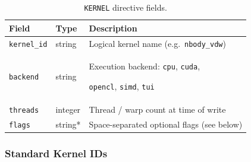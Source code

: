\documentclass[12pt, a4paper, oneside]{article}
\begin{document}
\begin{table}[htbp]

  \centering

  \caption{\texttt{KERNEL} directive fields.}

  \label{tab:kernel_fields}

  \begin{tabular}{lll}

    \toprule

    Field & Type & Description \\

    \midrule

    \texttt{kernel\_id} & string  & Logical kernel name (e.g.\ \texttt{nbody\_vdw}) \\

    \texttt{backend}    & string  & Execution backend: \texttt{cpu}, \texttt{cuda},

                                   \texttt{opencl}, \texttt{simd}, \texttt{tui} \\

    \texttt{threads}    & integer & Thread / warp count at time of write \\

    \texttt{flags}      & string* & Space-separated optional flags (see below) \\

    \bottomrule

  \end{tabular}

\end{table}


\subsubsection{Standard Kernel IDs}
\end{document}
